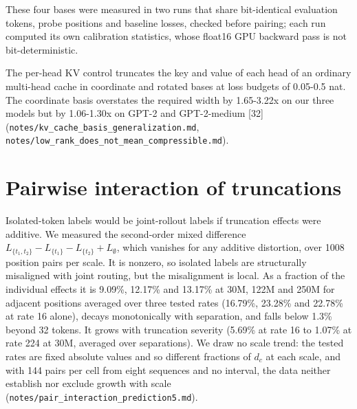 \documentclass[11pt]{article}
\begin{document}
\begin{table}[t]
\centering
\caption{DeepSeek-V2-Lite: mean suffix-safe rate as a fraction of $d_c$ in the four bases.}
\end{table}

These four bases were measured in two runs that share bit-identical evaluation tokens, probe positions and baseline losses, checked before pairing; each run computed its own calibration statistics, whose float16 GPU backward pass is not bit-deterministic.

The per-head KV control truncates the key and value of each head of an ordinary multi-head cache in coordinate and rotated bases at loss budgets of 0.05-0.5 nat. The coordinate basis overstates the required width by 1.65-3.22x on our three models but by 1.06-1.30x on GPT-2 and GPT-2-medium [32] (\texttt{notes/\allowbreak kv\_cache\_basis\_generalization.md}, \texttt{notes/\allowbreak low\_rank\_does\_not\_mean\_compressible.md}).

\section{Pairwise interaction of truncations}

Isolated-token labels would be joint-rollout labels if truncation effects were additive. We measured the second-order mixed difference $L_{\{t_1,t_2\}}-L_{\{t_1\}}-L_{\{t_2\}}+L_{\emptyset}$, which vanishes for any additive distortion, over 1008 position pairs per scale. It is nonzero, so isolated labels are structurally misaligned with joint routing, but the misalignment is local. As a fraction of the individual effects it is 9.09\%, 12.17\% and 13.17\% at 30M, 122M and 250M for adjacent positions averaged over three tested rates (16.79\%, 23.28\% and 22.78\% at rate 16 alone), decays monotonically with separation, and falls below 1.3\% beyond 32 tokens. It grows with truncation severity (5.69\% at rate 16 to 1.07\% at rate 224 at 30M, averaged over separations). We draw no scale trend: the tested rates are fixed absolute values and so different fractions of $d_c$ at each scale, and with 144 pairs per cell from eight sequences and no interval, the data neither establish nor exclude growth with scale (\texttt{notes/\allowbreak pair\_interaction\_prediction5.md}).
\end{document}
